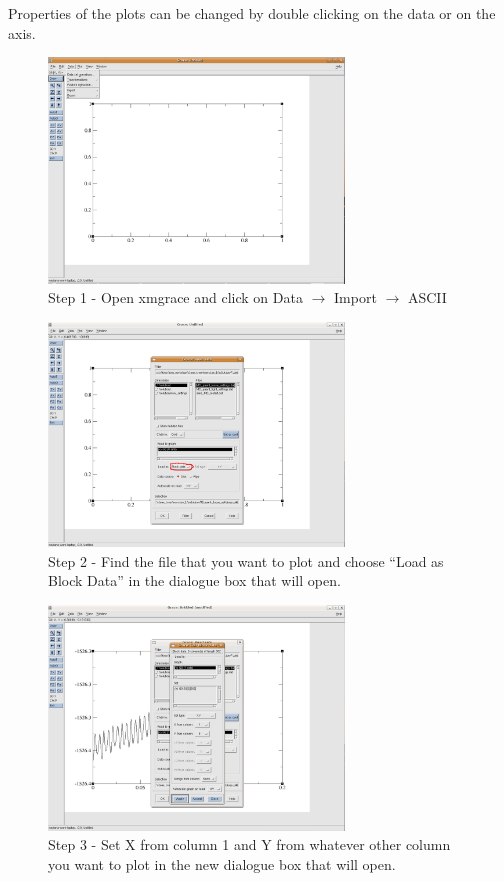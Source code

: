 \documentclass[a4paper,11pt]{scrartcl}
\begin{document}
Properties of the plots can be changed by double clicking on the data or on the axis.

\begin{figure}[ht]
\begin{center}
\includegraphics[width=0.7\textwidth]{xmgrace1}
\caption{Step 1 - Open xmgrace and click on Data $\rightarrow$ Import $\rightarrow$ ASCII}
\label{xmgrace1}
\end{center}
\end{figure}

\begin{figure}[ht]
\begin{center}
\includegraphics[width=0.7\textwidth]{xmgrace2}
\caption{Step 2 - Find the file that you want to plot and choose ``Load as Block Data'' in the dialogue box that will open.}
\label{xmgrace2}
\end{center}
\end{figure}

\begin{figure}[ht]
\begin{center}
\includegraphics[width=0.7\textwidth]{xmgrace3}
\caption{Step 3 - Set X from column 1 and Y from whatever other column you want to plot in the new dialogue box that will open.}
\label{xmgrace3}
\end{center}
\end{figure}
\end{document}

